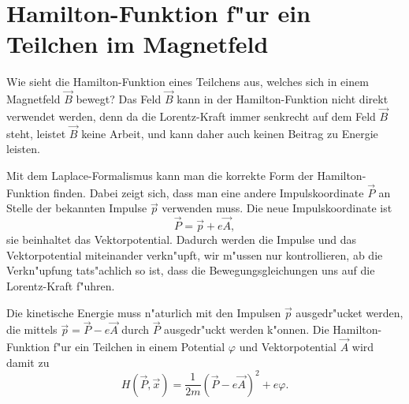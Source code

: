 \section{Hamilton-Funktion f"ur ein Teilchen im Magnetfeld}
Wie sieht die Hamilton-Funktion eines Teilchens aus, welches  sich in
einem Magnetfeld $\vec B$ bewegt?
Das Feld $\vec B$ kann in der Hamilton-Funktion nicht direkt
verwendet werden, denn da die Lorentz-Kraft immer senkrecht
auf dem Feld $\vec B$ steht, leistet $\vec B$ keine Arbeit, und kann
daher auch keinen Beitrag zu Energie leisten.

Mit dem Laplace-Formalismus kann man die korrekte Form der
Hamilton-Funktion finden.
Dabei zeigt sich, dass man eine andere Impulskoordinate $\vec P$
an Stelle der bekannten Impulse $\vec p$ verwenden muss. 
Die neue Impulskoordinate ist 
\[
\vec P = \vec p + e\vec A,
\]
sie beinhaltet das Vektorpotential.
Dadurch werden die Impulse und das Vektorpotential miteinander 
verkn"upft, wir m"ussen nur kontrollieren, ab die Verkn"upfung
tats"achlich so ist, dass die Bewegungsgleichungen uns auf die
Lorentz-Kraft f"uhren.

Die kinetische Energie muss n"aturlich mit den Impulsen $\vec p$ ausgedr"ucket
werden, die mittels $\vec p=\vec P-e\vec A$ durch $\vec P$
ausgedr"uckt werden k"onnen.
Die Hamilton-Funktion f"ur ein Teilchen in einem Potential $\varphi$
und Vektorpotential $\vec A$ wird damit zu
\begin{equation}
H(\vec P, \vec x)=\frac1{2m}(\vec P-e\vec A)^2+e\varphi.
\label{hamiltonmitmagnetfeld}
\end{equation}

